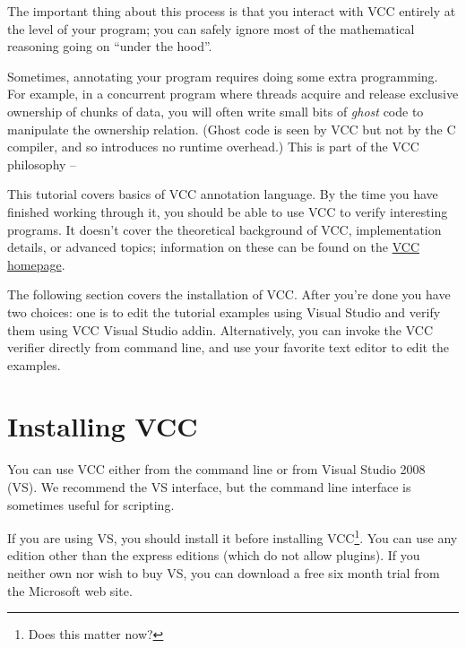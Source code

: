 The important thing about this process is that you interact with VCC
entirely at the level of your program; you can safely ignore most of
the mathematical reasoning going on ``under the hood''.

Sometimes, annotating your program requires doing some extra
programming. For example, in a concurrent program where threads
acquire and release exclusive ownership of chunks of data, you will
often write small bits of \emph{ghost} code to manipulate the
ownership relation. (Ghost code is seen by VCC but not by the C
compiler, and so introduces no runtime overhead.) This is part of the
VCC philosophy -- 

This tutorial covers basics of VCC annotation language. By the time
you have finished working through it, you should be able to use VCC to
verify interesting programs. It doesn't cover the theoretical
background of VCC, implementation details, or advanced topics;
information on these can be found on the \href{http://vcc.codeplex.com/}{VCC homepage}.


The following section covers the installation of VCC.
After you're done you have two choices: one is to edit the tutorial examples
using Visual Studio and verify them using VCC Visual Studio addin.
Alternatively, you can invoke the VCC verifier directly from command line,
and use your favorite text editor to edit the examples.

\section{Installing VCC} 
You can use VCC either from the command line or from Visual Studio
2008 (VS).  We recommend the VS interface, but the command line interface
is sometimes useful for scripting.

If you are using VS, you should install it before
installing VCC\footnote{Does this matter now?}. You can use any
edition other than the express editions (which do not allow
plugins). If you neither own nor wish to buy VS, you can download a
free six month trial from the Microsoft web site.

